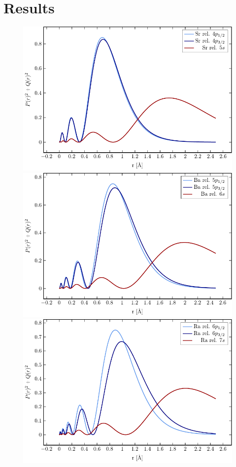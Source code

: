 \section{Results}



\begin{figure}[h]
 \centering
 \includegraphics[width=\columnwidth]{pics/sr_ion_R.pdf}\\
 \includegraphics[width=\columnwidth]{pics/ba_ion_R.pdf}\\
 \includegraphics[width=\columnwidth]{pics/ra_ion_R.pdf}\\

\end{figure}

